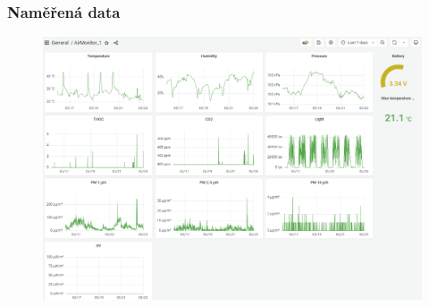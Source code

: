 \documentclass[%
  12pt,       				%
	t,                  %
	aspectratio=1610,   %
	unicode,						%
]{beamer}				    	%
\begin{document}
\begin{frame}
	\frametitle{Naměřená data}
	\begin{figure}
		\centering
		\includegraphics[width=\textwidth]{obrazky/grafana.png}
	\end{figure}


\end{frame}






	
\end{document}
